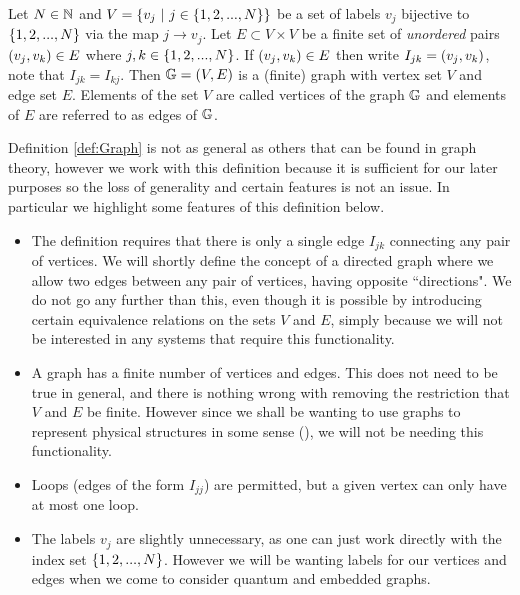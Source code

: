 \begin{definition}[Graph] \label{def:Graph}
	Let $N\in\mathbb{N}$ and $V=\clbracs{v_j \ \vert \ j\in\clbracs{1,2,...,N}}$ be a set of labels $v_j$ bijective to $\left\{ 1,2,...,N \right\}$ via the map $j\rightarrow v_j$.
	Let $E\subset V\times V$ be a finite set of \textit{unordered} pairs $\left( v_j,v_k \right)\in E$ where $j,k\in\left\{ 1,2,...,N \right\}$.
	If $\left( v_j,v_k \right)\in E$ then write $I_{jk} = \left( v_j,v_k \right)$, note that $I_{jk}=I_{kj}$.
	Then $\mathbb{G}=\left( V,E \right)$ is a (finite) graph with vertex set $V$ and edge set $E$.
	Elements of the set $V$ are called vertices of the graph $\mathbb{G}$ and elements of $E$ are referred to as edges of $\mathbb{G}$.	
\end{definition}
Definition \ref{def:Graph} is not as general as others that can be found in graph theory, however we work with this definition because it is sufficient for our later purposes so the loss of generality and certain features is not an issue.
In particular we highlight some features of this definition below.
\begin{itemize}
	\item The definition requires that there is only a single edge $I_{jk}$ connecting any pair of vertices.
	We will shortly define the concept of a directed graph where we allow two edges between any pair of vertices, having opposite ``directions".
	We do not go any further than this, even though it is possible by introducing certain equivalence relations on the sets $V$ and $E$, simply because we will not be interested in any systems that require this functionality. 
	\item A graph has a finite number of vertices and edges.
	This does not need to be true in general, and there is nothing wrong with removing the restriction that $V$ and $E$ be finite.
	However since we shall be wanting to use graphs to represent physical structures in some sense (), we will not be needing this functionality.
	\item Loops (edges of the form $I_{jj}$) are permitted, but a given vertex can only have at most one loop.
	\item The labels $v_j$ are slightly unnecessary, as one can just work directly with the index set $\left\{ 1,2,...,N \right\}$.
	However we will be wanting labels for our vertices and edges when we come to consider quantum and embedded graphs.
\end{itemize}

